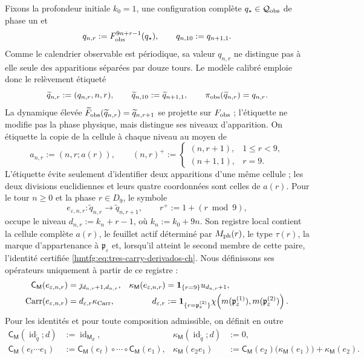 Fixons la profondeur initiale \(k_0=1\), une configuration complète
\(q_\star\in\mathcal Q_{\rm obs}\) de phase un et
\[
 q_{n,r}:=F_{\rm obs}^{9n+r-1}(q_\star),\qquad
 q_{n,10}:=q_{n+1,1}.
\]
Comme le calendrier observable est périodique, sa valeur \(q_{n,r}\) ne
distingue pas à elle seule des apparitions séparées par douze tours. Le modèle
calibré emploie donc le relèvement étiqueté
\[
 \widetilde q_{n,r}:=(q_{n,r},n,r),\qquad
 \widetilde q_{n,10}:=\widetilde q_{n+1,1},\qquad
 \pi_{\rm obs}(\widetilde q_{n,r})=q_{n,r}.
\]
La dynamique élevée \(\widetilde F_{\rm obs}(\widetilde q_{n,r})
=\widetilde q_{n,r+1}\) se projette sur \(F_{\rm obs}\) ; l'étiquette ne modifie pas la phase physique, mais distingue ses niveaux d'apparition. On étiquette la copie de la cellule à chaque niveau au moyen de
\[
 a_{n,r}:=(n,r;a(r)),\qquad
 (n,r)^+:=
 \begin{cases}
  (n,r+1),&1\le r<9,\\
  (n+1,1),&r=9.
 \end{cases}
\]
L’étiquette évite seulement d’identifier deux apparitions d’une même cellule ; les
deux divisions euclidiennes et leurs quatre coordonnées sont celles de \(a(r)\).
Pour le tour \(n\ge0\) et la phase \(r\in D_9\), le symbole
\[
 e_{\varepsilon,n,r}:\widetilde q_{n,r}
 \longrightarrow\widetilde q_{n,r+1},
 \qquad r^+:=1+(r\bmod9),
\]
occupe le niveau \(d_{n,r}:=k_n+r-1\), où \(k_n:=k_0+9n\). Son registre local contient la cellule complète \(a(r)\), le feuillet actif déterminé par \(M_{\rm ph}(r)\), le type \(\tau(r)\), la marque d'appartenance à \(\mathfrak p_\varepsilon\) et, lorsqu'il atteint le second membre de cette paire, l'identité certifiée \eqref{hmtfg:eq:tres-carry-derivados-ch}. Nous définissons ses opérateurs uniquement à partir de ce registre :
\begin{align}
 \mathsf C_{\mathsf M}(e_{\varepsilon,n,r})
   &=\jmath_{d_{n,r}+1,d_{n,r}},&
 \kappa_{\mathsf M}(e_{\varepsilon,n,r})
   &=\mathbf1_{\{r=9\}}u_{d_{n,r}+1},
 \label{hmtfg:eq:memoria-arista-ch}\\
       \operatorname{Carr}(e_{\varepsilon,n,r})
   &=d_{\varepsilon,r}\kappa_{\rm Carr},&
 d_{\varepsilon,r}
   &:=\mathbf1_{\{r=\mathfrak p_\varepsilon^{(2)}\}}
       \chi\!\left(m(\mathfrak p_\varepsilon^{(1)}),
                    m(\mathfrak p_\varepsilon^{(2)})\right).
 \label{hmtfg:eq:carry-arista-derivado-ch}
\end{align}
Pour les identités et pour toute composition admissible, on définit en outre
\begin{align}
 \mathsf C_{\mathsf M}(\operatorname{id}_{\widetilde q};d)
   &:=\operatorname{id}_{\mathsf M_d},&
 \kappa_{\mathsf M}(\operatorname{id}_{\widetilde q};d)&:=0,
 \label{hmtfg:eq:memoria-identidad-ch}\\
 \mathsf C_{\mathsf M}(e_t\cdots e_1)
   &:=\mathsf C_{\mathsf M}(e_t)\circ\cdots\circ
      \mathsf C_{\mathsf M}(e_1),&
 \kappa_{\mathsf M}(e_2e_1)
   &:=\mathsf C_{\mathsf M}(e_2)
        \bigl(\kappa_{\mathsf M}(e_1)\bigr)
      +\kappa_{\mathsf M}(e_2).
 \label{hmtfg:eq:cociclo-memoria-calibrado-ch}
\end{align}
